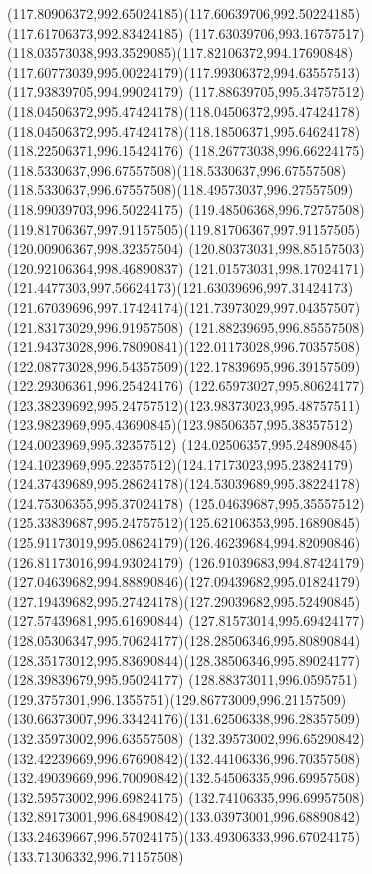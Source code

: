 {{  \curveto(117.80906372,992.65024185)(117.60639706,992.50224185)(117.61706373,992.83424185)
  \curveto(117.63039706,993.16757517)(118.03573038,993.3529085)(117.82106372,994.17690848)
  \curveto(117.60773039,995.00224179)(117.99306372,994.63557513)(117.93839705,994.99024179)
  \curveto(117.88639705,995.34757512)(118.04506372,995.47424178)(118.04506372,995.47424178)
  \curveto(118.04506372,995.47424178)(118.18506371,995.64624178)(118.22506371,996.15424176)
  \curveto(118.26773038,996.66224175)(118.5330637,996.67557508)(118.5330637,996.67557508)
  \curveto(118.5330637,996.67557508)(118.49573037,996.27557509)(118.99039703,996.50224175)
  \curveto(119.48506368,996.72757508)(119.81706367,997.91157505)(119.81706367,997.91157505)
  \lineto(120.00906367,998.32357504)
  \lineto(120.80373031,998.85157503)
  \lineto(120.92106364,998.46890837)
  \curveto(121.01573031,998.17024171)(121.4477303,997.56624173)(121.63039696,997.31424173)
  \curveto(121.67039696,997.17424174)(121.73973029,997.04357507)(121.83173029,996.91957508)
  \curveto(121.88239695,996.85557508)(121.94373028,996.78090841)(122.01173028,996.70357508)
  \curveto(122.08773028,996.54357509)(122.17839695,996.39157509)(122.29306361,996.25424176)
  \curveto(122.65973027,995.80624177)(123.38239692,995.24757512)(123.98373023,995.48757511)
  \curveto(123.9823969,995.43690845)(123.98506357,995.38357512)(124.0023969,995.32357512)
  \curveto(124.02506357,995.24890845)(124.1023969,995.22357512)(124.17173023,995.23824179)
  \curveto(124.37439689,995.28624178)(124.53039689,995.38224178)(124.75306355,995.37024178)
  \curveto(125.04639687,995.35557512)(125.33839687,995.24757512)(125.62106353,995.16890845)
  \curveto(125.91173019,995.08624179)(126.46239684,994.82090846)(126.81173016,994.93024179)
  \curveto(126.91039683,994.87424179)(127.04639682,994.88890846)(127.09439682,995.01824179)
  \curveto(127.19439682,995.27424178)(127.29039682,995.52490845)(127.57439681,995.61690844)
  \curveto(127.81573014,995.69424177)(128.05306347,995.70624177)(128.28506346,995.80890844)
  \curveto(128.35173012,995.83690844)(128.38506346,995.89024177)(128.39839679,995.95024177)
  \curveto(128.88373011,996.0595751)(129.3757301,996.1355751)(129.86773009,996.21157509)
  \curveto(130.66373007,996.33424176)(131.62506338,996.28357509)(132.35973002,996.63557508)
  \curveto(132.39573002,996.65290842)(132.42239669,996.67690842)(132.44106336,996.70357508)
  \curveto(132.49039669,996.70090842)(132.54506335,996.69957508)(132.59573002,996.69824175)
  \curveto(132.74106335,996.69957508)(132.89173001,996.68490842)(133.03973001,996.68890842)
  \curveto(133.24639667,996.57024175)(133.49306333,996.67024175)(133.71306332,996.71157508)
}}
